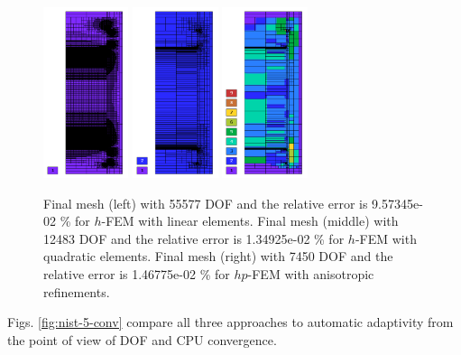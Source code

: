 \documentclass[12pt]{elsarticle}
\begin{document}
\begin{figure}[H]
\centering
\includegraphics[height=5cm]{nist/nist-5/mesh_h1_aniso.png}
\includegraphics[height=5cm]{nist/nist-5/mesh_h2_aniso.png}
\includegraphics[height=5cm]{nist/nist-5/mesh_hp_aniso.png}
\caption{
Final mesh (left) with 55577 DOF and the relative error is 9.57345e-02 \% for $h$-FEM with linear elements.
Final mesh (middle) with 12483 DOF and the relative error is 1.34925e-02 \% for $h$-FEM with quadratic elements.
Final mesh (right) with 7450 DOF and the relative error is 1.46775e-02 \% for $hp$-FEM with anisotropic refinements.}
\label{fig:nist-5-hp-aniso}
\end{figure}

Figs. \ref{fig:nist-5-conv} compare all
three approaches to automatic adaptivity from the point
of view of DOF and CPU convergence.
\end{document}
